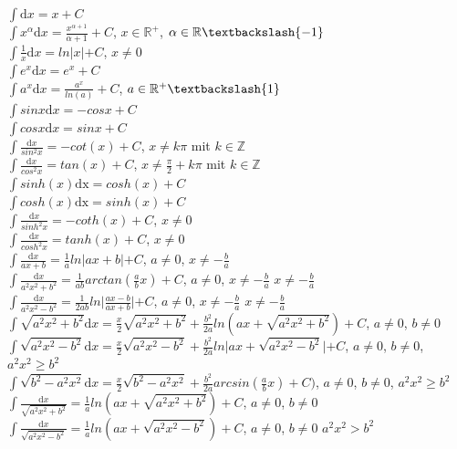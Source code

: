 	$\int \mathrm dx = x + C$\\
	$\int x^{\alpha} \mathrm dx = \frac{x^{\alpha + 1}}{\alpha + 1} + C$, $x \in
	\mathbb{R}^+$, $\alpha \in \mathbb{R} \textbackslash \{-1\}$\\
	$\int \frac{1}{x} \mathrm dx = ln \lvert x \lvert + C$, $x \neq 0$\\
	$\int e^x \mathrm dx = e^x + C$\\
	$\int a^x \mathrm dx = \frac{a^x}{ln(a)} + C$, $a \in \mathbb{R}^+
	\textbackslash \{1\}$\\
	$\int sin x \mathrm dx = - cos x + C$\\
	$\int cos x \mathrm dx = sin x + C$\\
	$\int \frac{\mathrm dx}{sin^2 x} = -cot(x) + C$, $x \neq k \pi$ mit $k \in
	\mathbb{Z}$\\
	$\int \frac{\mathrm dx}{cos^2 x} = tan(x) + C$, $x \neq \frac{\pi}{2} + k \pi$
	mit $k \in \mathbb{Z}$\\
	$\int sinh(x) \mathrm{dx} = cosh(x) + C$\\
	$\int cosh(x) \mathrm{dx} = sinh(x) + C$\\
	$\int \frac{\mathrm dx}{sinh^2 x} = -coth(x) + C$, $x \neq 0$\\
	$\int \frac{\mathrm dx}{cosh^2 x} = tanh(x) + C$, $x \neq 0$\\
	$\int \frac{\mathrm dx}{ax + b} = \frac{1}{a} ln \lvert ax + b \lvert + C$, $a
	\neq 0$, $x \neq - \frac{b}{a}$\\
	$\int \frac{\mathrm dx}{a^2x^2 + b^2} = \frac{1}{ab} arctan(\frac{a}{b} x) +
	C$, $a \neq 0$, $x \neq - \frac{b}{a}$ $x \neq -\frac{b}{a}$\\
	$\int \frac{\mathrm dx}{a^2x^2 - b^2} = \frac{1}{2ab} ln \lvert \frac{ax -
	b}{ax + b} \lvert + C$, $a \neq 0$, $x \neq - \frac{b}{a}$ $x \neq
	-\frac{b}{a}$\\
	$\int \sqrt{a^2 x^2 + b^2} \mathrm dx = \frac{x}{2} \sqrt{a^2 x^2 + b^2} +
	\frac{b^2}{2a} ln(ax + \sqrt{a^2 x^2 + b^2}) + C$, $a \neq 0$, $b \neq 0$\\
	$\int \sqrt{a^2 x^2 - b^2} \mathrm dx = \frac{x}{2} \sqrt{a^2 x^2 - b^2} +
	\frac{b^2}{2a} ln \lvert ax + \sqrt{a^2 x^2 - b^2} \lvert + C$, $a \neq 0$, $b
	\neq 0$, $a^2 x^2 \geq b^2$\\
	$\int \sqrt{b^2 - a^2x^2} \mathrm dx = \frac{x}{2} \sqrt{b^2 - a^2x^2} +
	\frac{b^2}{2a} arcsin(\frac{a}{b} x) + C)$, $a \neq 0$, $b \neq 0$,
	$a^2 x^2 \geq b^2$\\
	$\int \frac{\mathrm dx}{\sqrt{a^2 x^2 + b^2}} = \frac{1}{a} ln(ax +
	\sqrt{a^2 x^2 + b^2}) + C$, $a \neq 0$, $b \neq 0$\\
	$\int \frac{\mathrm dx}{\sqrt{a^2 x^2 - b^2}} = \frac{1}{a} ln(ax +
	\sqrt{a^2 x^2 - b^2}) + C$, $a \neq 0$, $b \neq 0$ $a^2 x^2 > b^2$\\
			
